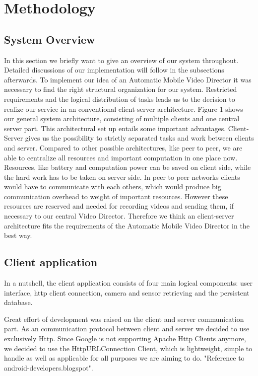 \documentclass[conference]{IEEEtran}
\begin{document}
\section{Methodology}

\subsection{System Overview}
In this section we briefly want to give an overview of our system throughout. Detailed discussions of our implementation will follow in the subsections afterwards. 
To implement our idea of an Automatic Mobile Video Director it was necessary to find the right structural organization for our system. Restricted requirements and the logical distribution of tasks leads us to the decision to realize our service in an conventional client-server architecture. Figure 1 shows our general system architecture, consisting of multiple clients and one central server part.
This architectural set up entails some important advantages. Client-Server gives us the possibility to strictly separated tasks and work between clients and server. Compared to other possible architectures, like peer to peer, we are able  to centralize all resources and important computation in one place now. Resources, like battery and computation power can be saved on client side, while the hard work has to be taken on server side. In peer to peer networks clients would have to communicate with each others, which would produce big communication overhead to weight of important resources. However these resources are reserved and needed for recording videos and sending them, if necessary to our central Video Director. Therefore we think an client-server architecture fits the requirements of the Automatic Mobile Video Director in the best way. 


\subsection{Client application}

In a nutshell, the client application consists of four main logical components: user interface, http client connection, camera and sensor retrieving and the persistent database.

Great effort of development was raised on the client and server communication part. As an communication protocol between client and server we decided to use exclusively Http. Since Google is not supporting Apache Http Clients anymore, we decided to use the HttpURLConnection Client, which is lightweight, simple to handle as well as applicable for all purposes we are aiming to do. "Reference to android-developers.blogspot".
\end{document}
